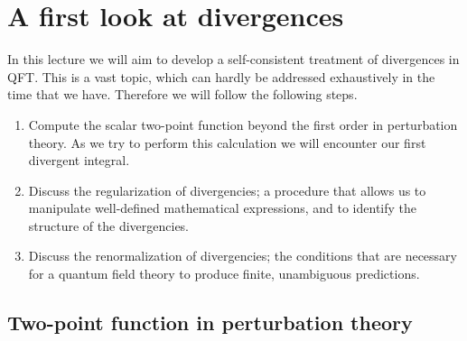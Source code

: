 \renewcommand{\tphi}{\tilde{\phi}}
\renewcommand{\tj}{\tilde{J}}
\renewcommand{\tchi}{\tilde{\chi}}
\renewcommand{\psibar}{\bar{\psi}}
\renewcommand{\etabar}{\bar{\eta}}
\renewcommand{\munu}{{\mu\nu}}
\renewcommand{\tDelta}{\tilde{\Delta}}
\renewcommand{\SProp}[1]{\frac{1}{#1^2-m^2+i\epsilon}}
\renewcommand{\ESProp}[2]{\frac{1}{\left(#1^2+m^2\right)^#2}}


\section{A first look at divergences}
\label{sec:a-first-look}

In this lecture we will aim to develop a self-consistent treatment of
divergences in QFT. This is a vast topic, which can hardly be
addressed exhaustively in the time that we have. Therefore we will
follow the following steps.
\begin{enumerate}
\item Compute the scalar two-point function beyond the first order in
  perturbation theory. As we try to perform this calculation we will
  encounter our first divergent integral.
\item Discuss the regularization of divergencies; \ie a procedure that
  allows us to manipulate well-defined mathematical expressions, and
  to identify the structure of the divergencies.
\item Discuss the renormalization of divergencies; \ie the conditions
  that are necessary for a quantum field theory to produce finite,
  unambiguous predictions. 
\end{enumerate}

\subsection{Two-point function in perturbation theory}
\label{sec:scalar-two-point}

